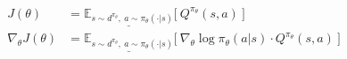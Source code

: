 \begin{align*}
J(\theta) &= \underline{\mathbb{E}_{s \sim d^{\pi_\theta},\ a \sim \pi_\theta(\cdot|s)}} \Big\lbrack\ Q^{\pi_\theta}(s, a) \ \Big\rbrack \\
\nabla_\theta J(\theta) &= \underline{\mathbb{E}_{s \sim d^{\pi_\theta},\ a \sim \pi_\theta(\cdot|s)}} \Big\lbrack\ \nabla_\theta\log \pi_\theta(a|s)\cdot Q^{\pi_\theta}(s, a) \ \Big\rbrack
\end{align*}